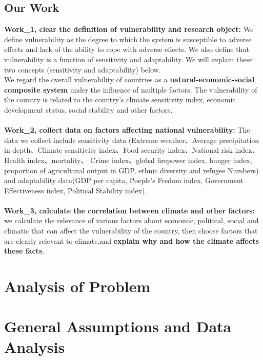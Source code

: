 \documentclass{mcmthesis}
\begin{document}
\subsection{Our Work}
  \textbf{Work\_1, clear the definition of vulnerability and research object:} We 
  define vulnerability as the degree to which the system is susceptible to adverse effects 
  and lack of the ability to cope with adverse effects. We also define that vulnerability 
  is a function of sensitivity and adaptability. We will explain these two concepts 
  (sensitivity and adaptability) below.\\ We regard the overall vulnerability of 
  countries as a \textbf{natural-economic-social composite system} under the influence of 
  multiple factors. The vulnerability of the country is related to the country's 
  climate sensitivity index, economic development status, social stability and 
  other factors.\\\\
  \textbf{Work\_2, collect data on factors affecting national vulnerability:} The data we
  collect include sensitivity data (Extreme weather、Average precipitation in depth、Climate
  sensitivity index、Food security index、National risk index、Health index、mortality、
  Crime index、global firepower index, hunger index,  proportion of agricultural output 
  in GDP, ethnic diversity and refugee Numbers) and adaptability data(GDP per capita, 
  Poeple's Fredom index, Government Effectiveness index, Political Stability index).\\\\
  \textbf{Work\_3, calculate the correlation between climate and other factors:} we 
  calculate the relevance of various factors about economic, political, social 
  and climatic that can affect the vulnerability of the country, then choose 
  factors that are clearly relevant to climate,and \textbf{explain why and how the 
  climate affects these facts}.




\section{Analysis of Problem}

\section{General Assumptions and Data Analysis}
\end{document}
